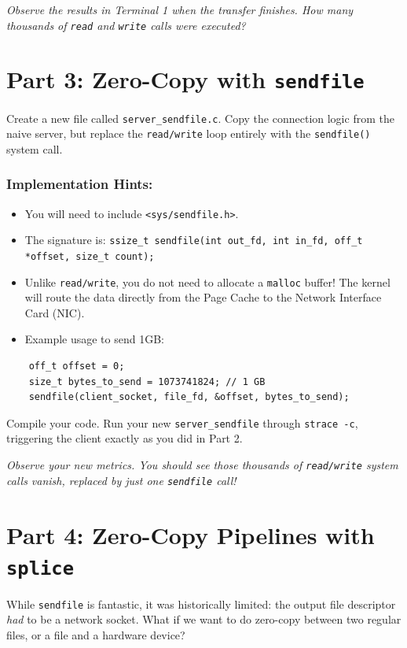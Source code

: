 \documentclass[11pt, a4paper]{article}
\begin{document}
\textit{Observe the results in Terminal 1 when the transfer finishes. How many thousands of \texttt{read} and \texttt{write} calls were executed?}

\section*{Part 3: Zero-Copy with \texttt{sendfile}}
Create a new file called \texttt{server\_sendfile.c}. Copy the connection logic from the naive server, but replace the \texttt{read/write} loop entirely with the \texttt{sendfile()} system call.

\subsubsection*{Implementation Hints:}
\begin{itemize}
    \item You will need to include \texttt{<sys/sendfile.h>}.
    \item The signature is: \texttt{ssize\_t sendfile(int out\_fd, int in\_fd, off\_t *offset, size\_t count);}
    \item Unlike \texttt{read/write}, you do not need to allocate a \texttt{malloc} buffer! The kernel will route the data directly from the Page Cache to the Network Interface Card (NIC).
    \item Example usage to send 1GB:
\end{itemize}

\begin{verbatim}
    off_t offset = 0;
    size_t bytes_to_send = 1073741824; // 1 GB
    sendfile(client_socket, file_fd, &offset, bytes_to_send);
\end{verbatim}

Compile your code. Run your new \texttt{server\_sendfile} through \texttt{strace -c}, triggering the client exactly as you did in Part 2. 

\textit{Observe your new metrics. You should see those thousands of \texttt{read/write} system calls vanish, replaced by just one \texttt{sendfile} call!}

\section*{Part 4: Zero-Copy Pipelines with \texttt{splice}}
While \texttt{sendfile} is fantastic, it was historically limited: the output file descriptor \textit{had} to be a network socket. What if we want to do zero-copy between two regular files, or a file and a hardware device? 
\end{document}
